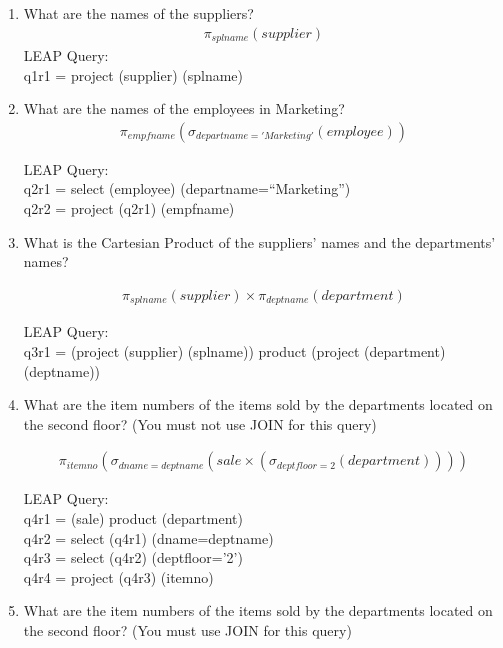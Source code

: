 \documentclass[10pt]{article}
\begin{document}
\vspace{1em}

\begin{enumerate}
\item What are the names of the suppliers?
  \begin{align*}
    \pi_{splname}(supplier)
  \end{align*}
  LEAP Query:\\
  q1r1 = project (supplier) (splname)

\item What are the names of the employees in Marketing?
  \begin{align*}
    \pi_{empfname}(\sigma_{departname='Marketing'}(employee))
  \end{align*}

  LEAP Query:\\
  q2r1 = select (employee) (departname=``Marketing'')\\
  q2r2 = project (q2r1) (empfname)

\item What is the Cartesian Product of the suppliers' names and the
  departments' names?

  \begin{align*}
    \pi_{splname}(supplier) \times \pi_{deptname}(department)
  \end{align*}

  LEAP Query:\\
  q3r1 = (project (supplier) (splname)) product (project (department)
  (deptname))

\item What are the item numbers of the items sold by the departments
  located on the second floor? (You must not use JOIN for this query)

  \begin{align*}
    \pi_{itemno}(\sigma_{dname=deptname}(sale \times
    (\sigma_{deptfloor=2}(department))))
  \end{align*}

  LEAP Query:\\
  q4r1 = (sale) product (department)\\
  q4r2 = select (q4r1) (dname=deptname)\\
  q4r3 = select (q4r2) (deptfloor='2')\\
  q4r4 = project (q4r3) (itemno)

\item What are the item numbers of the items sold by the departments
  located on the second floor? (You must use JOIN for this query)


\end{enumerate}
\end{document}
